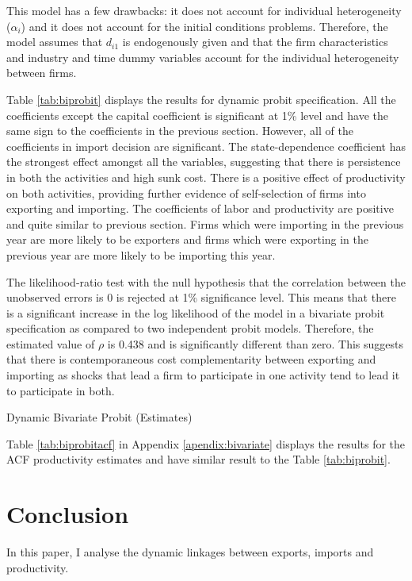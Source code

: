 \documentclass[12pt]{article}
\begin{document}
This model has a few drawbacks: it does not account for individual
heterogeneity ($\alpha_{i}$) and it does not account for the  initial
conditions problems. Therefore, the model assumes that $d_{i1}$ is 
endogenously given and that the firm characteristics and industry and time  dummy variables account
for the individual heterogeneity between firms.

Table \ref{tab:biprobit} displays the results for dynamic probit specification. All
  the coefficients except the capital coefficient is significant at
  1\% level and have the same sign 
  to the coefficients in the previous section. However, all of the coefficients
  in import decision are significant. The
  state-dependence coefficient has the strongest effect amongst all
  the variables, suggesting that there is persistence in both the
  activities and high sunk cost. There is a positive effect of 
  productivity on both activities, providing further evidence of
  self-selection of firms into exporting and importing. The
  coefficients of labor and productivity are positive and
  quite similar to previous section. Firms which were importing in the previous year are more
  likely to be exporters and firms which were exporting in the
  previous year are more likely to be importing this year.

 The likelihood-ratio test with the null hypothesis that
  the correlation between the unobserved errors is 0 is rejected at
  1\% significance level. This means that there is a significant
  increase in the log likelihood of the model in a bivariate probit
  specification as compared to two independent probit models.
  Therefore, the estimated value of $\rho$ is 0.438 and
  is significantly different than zero. This suggests that there is
  contemporaneous cost complementarity between exporting and importing 
as shocks that lead a firm to participate in one activity tend
to lead it to participate in both.


\begin{center}
\begin{table}[H]
\caption{Dynamic Bivariate Probit (Estimates)}
\label{tab:biprobit}

\end{table}
\end{center} 

Table \ref{tab:biprobitacf} in Appendix \ref{apendix:bivariate} displays the results for the ACF
productivity estimates and have  similar result to the Table \ref{tab:biprobit}. 
 
\section{Conclusion}\label{sec:conclusion}
In this paper, I analyse the dynamic linkages between exports, imports
and productivity.  
\end{document}
